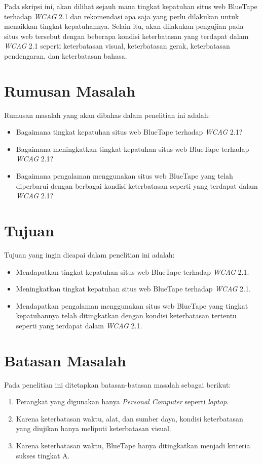Pada skripsi ini, akan dilihat sejauh mana tingkat kepatuhan situs web BlueTape terhadap \textit{WCAG} 2.1 dan rekomendasi apa saja yang perlu dilakukan untuk menaikkan tingkat kepatuhannya. Selain itu, akan dilakukan pengujian pada situs web tersebut dengan beberapa kondisi keterbatasan yang terdapat dalam \textit{WCAG} 2.1 seperti keterbatasan visual, keterbatasan gerak, keterbatasan pendengaran, dan keterbatasan bahasa.

\section{Rumusan Masalah}
\label{sec:rumusan}
Rumusan masalah yang akan dibahas dalam penelitian ini adalah: 
\begin{itemize}
	\item Bagaimana tingkat kepatuhan situs web BlueTape terhadap \textit{WCAG} 2.1?
	\item Bagaimana meningkatkan tingkat kepatuhan situs web BlueTape terhadap \textit{WCAG} 2.1?  
	\item Bagaimana pengalaman menggunakan situs web BlueTape yang telah diperbarui dengan berbagai kondisi keterbatasan seperti yang terdapat dalam \textit{WCAG} 2.1?
\end{itemize}

\section{Tujuan}
\label{sec:tujuan}
Tujuan yang ingin dicapai dalam penelitian ini adalah:
\begin{itemize}
	\item Mendapatkan tingkat kepatuhan situs web BlueTape terhadap \textit{WCAG} 2.1.
	\item Meningkatkan tingkat kepatuhan situs web BlueTape terhadap \textit{WCAG} 2.1.
	\item Mendapatkan pengalaman menggunakan situs web BlueTape yang tingkat kepatuhannya telah ditingkatkan dengan kondisi keterbatasan tertentu seperti yang terdapat dalam \textit{WCAG} 2.1.
\end{itemize}

\section{Batasan Masalah}
\label{sec:batasan}
Pada penelitian ini ditetapkan batasan-batasan masalah sebagai berikut:
\begin{enumerate}
	\item Perangkat yang digunakan hanya \textit{Personal Computer} seperti \textit{laptop}.
	\item Karena keterbatasan waktu, alat, dan sumber daya, kondisi keterbatasan yang diujikan hanya meliputi keterbatasan visual.
	\item Karena keterbatasan waktu, BlueTape hanya ditingkatkan menjadi kriteria sukses tingkat A.
\end{enumerate}

